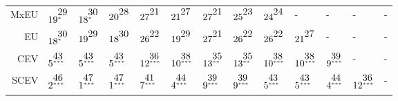 \begin{table}[!htb]
\begin{tabular}{rllllllllllll}
  MxEU & $19^{\stackrel{\textstyle29\hfill}{\scriptscriptstyle*\hfill}}$ & $18^{\stackrel{\textstyle30\hfill}{\scriptscriptstyle*\hfill}}$ & $20^{\stackrel{\textstyle28\hfill}{\scriptscriptstyle\hfill}}$ & $27^{\stackrel{\textstyle21\hfill}{\scriptscriptstyle\hfill}}$ & $21^{\stackrel{\textstyle27\hfill}{\scriptscriptstyle\hfill}}$ & $27^{\stackrel{\textstyle21\hfill}{\scriptscriptstyle\hfill}}$ & $25^{\stackrel{\textstyle23\hfill}{\scriptscriptstyle\hfill}}$ & $24^{\stackrel{\textstyle24\hfill}{\scriptscriptstyle\hfill}}$ & - & - & - & - \\ 
  EU & $18^{\stackrel{\textstyle30\hfill}{\scriptscriptstyle*\hfill}}$ & $19^{\stackrel{\textstyle29\hfill}{\scriptscriptstyle\hfill}}$ & $18^{\stackrel{\textstyle30\hfill}{\scriptscriptstyle\hfill}}$ & $26^{\stackrel{\textstyle22\hfill}{\scriptscriptstyle\hfill}}$ & $19^{\stackrel{\textstyle29\hfill}{\scriptscriptstyle\hfill}}$ & $27^{\stackrel{\textstyle21\hfill}{\scriptscriptstyle\hfill}}$ & $26^{\stackrel{\textstyle22\hfill}{\scriptscriptstyle\hfill}}$ & $26^{\stackrel{\textstyle22\hfill}{\scriptscriptstyle\hfill}}$ & $21^{\stackrel{\textstyle27\hfill}{\scriptscriptstyle\hfill}}$ & - & - & - \\ 
  CEV & $5^{\stackrel{\textstyle43\hfill}{\scriptscriptstyle***\hfill}}$ & $5^{\stackrel{\textstyle43\hfill}{\scriptscriptstyle***\hfill}}$ & $5^{\stackrel{\textstyle43\hfill}{\scriptscriptstyle***\hfill}}$ & $12^{\stackrel{\textstyle36\hfill}{\scriptscriptstyle***\hfill}}$ & $10^{\stackrel{\textstyle38\hfill}{\scriptscriptstyle***\hfill}}$ & $13^{\stackrel{\textstyle35\hfill}{\scriptscriptstyle**\hfill}}$ & $13^{\stackrel{\textstyle35\hfill}{\scriptscriptstyle**\hfill}}$ & $10^{\stackrel{\textstyle38\hfill}{\scriptscriptstyle***\hfill}}$ & $10^{\stackrel{\textstyle38\hfill}{\scriptscriptstyle***\hfill}}$ & $9^{\stackrel{\textstyle39\hfill}{\scriptscriptstyle***\hfill}}$ & - & - \\ 
  SCEV & $2^{\stackrel{\textstyle46\hfill}{\scriptscriptstyle***\hfill}}$ & $1^{\stackrel{\textstyle47\hfill}{\scriptscriptstyle***\hfill}}$ & $1^{\stackrel{\textstyle47\hfill}{\scriptscriptstyle***\hfill}}$ & $7^{\stackrel{\textstyle41\hfill}{\scriptscriptstyle***\hfill}}$ & $4^{\stackrel{\textstyle44\hfill}{\scriptscriptstyle***\hfill}}$ & $9^{\stackrel{\textstyle39\hfill}{\scriptscriptstyle***\hfill}}$ & $9^{\stackrel{\textstyle39\hfill}{\scriptscriptstyle***\hfill}}$ & $5^{\stackrel{\textstyle43\hfill}{\scriptscriptstyle***\hfill}}$ & $5^{\stackrel{\textstyle43\hfill}{\scriptscriptstyle***\hfill}}$ & $4^{\stackrel{\textstyle44\hfill}{\scriptscriptstyle***\hfill}}$ & $12^{\stackrel{\textstyle36\hfill}{\scriptscriptstyle***\hfill}}$ & - \\ 

\end{tabular}
\end{table}
